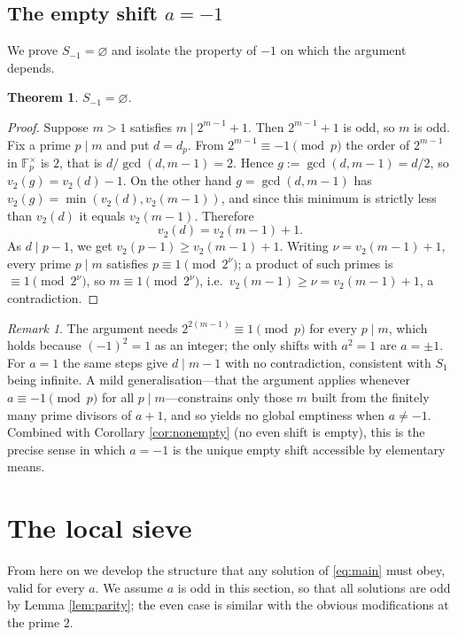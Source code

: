 \documentclass[11pt,reqno]{amsart}
\theoremstyle{plain}
\newtheorem{theorem}{Theorem}
\theoremstyle{definition}
\theoremstyle{remark}
\newtheorem{remark}{Remark}
\newcommand{\F}{\mathbb{F}}
\newcommand{\dvd}{\mid}
\begin{document}
\subsection{The empty shift $a=-1$}

We prove $S_{-1}=\varnothing$ and isolate the property of $-1$ on which the argument depends.

\begin{theorem}\label{thm:minusone}
$S_{-1}=\varnothing$.
\end{theorem}

\begin{proof}
Suppose $m>1$ satisfies $m\dvd2^{m-1}+1$. Then $2^{m-1}+1$ is odd, so $m$ is odd. Fix a prime $p\dvd m$ and put $d=d_p$. From $2^{m-1}\equiv-1\pmod p$ the order of $2^{m-1}$ in $\F_p^{\times}$ is $2$, that is $d/\gcd(d,m-1)=2$. Hence $g:=\gcd(d,m-1)=d/2$, so $v_2(g)=v_2(d)-1$. On the other hand $g=\gcd(d,m-1)$ has $v_2(g)=\min(v_2(d),v_2(m-1))$, and since this minimum is strictly less than $v_2(d)$ it equals $v_2(m-1)$. Therefore
\[
v_2(d)=v_2(m-1)+1.
\]
As $d\dvd p-1$, we get $v_2(p-1)\ge v_2(m-1)+1$. Writing $\nu=v_2(m-1)+1$, every prime $p\dvd m$ satisfies $p\equiv1\pmod{2^{\nu}}$; a product of such primes is $\equiv1\pmod{2^{\nu}}$, so $m\equiv1\pmod{2^{\nu}}$, i.e.\ $v_2(m-1)\ge\nu=v_2(m-1)+1$, a contradiction.
\end{proof}

\begin{remark}\label{rem:whyminusone}
The argument needs $2^{2(m-1)}\equiv1\pmod p$ for every $p\dvd m$, which holds because $(-1)^{2}=1$ as an integer; the only shifts with $a^{2}=1$ are $a=\pm1$. For $a=1$ the same steps give $d\dvd m-1$ with no contradiction, consistent with $S_1$ being infinite. A mild generalisation---that the argument applies whenever $a\equiv-1\pmod p$ for all $p\dvd m$---constrains only those $m$ built from the finitely many prime divisors of $a+1$, and so yields no global emptiness when $a\ne-1$. Combined with Corollary \ref{cor:nonempty} (no even shift is empty), this is the precise sense in which $a=-1$ is the unique empty shift accessible by elementary means.
\end{remark}

\section{The local sieve}\label{sec:sieve}

From here on we develop the structure that any solution of \eqref{eq:main} must obey, valid for every $a$. We assume $a$ is odd in this section, so that all solutions are odd by Lemma \ref{lem:parity}; the even case is similar with the obvious modifications at the prime $2$.
\end{document}
